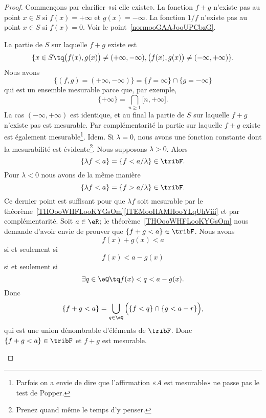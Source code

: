 \begin{proof}
	Commençons par clarifier «si elle existe». La fonction \( f+g\) n'existe pas au point \( x\in S\) si \( f(x)=+\infty\) et \( g(x)=-\infty\). La fonction \( 1/f\) n'existe pas au point \( x\in S\) si \( f(x)=0\). Voir le point~\ref{normooGAAJooUPCbzG}.
	\begin{subproof}
		La partie de \( S\) sur laquelle \( f+g\) existe est
		\begin{equation}
			\{ x\in S\tq \big( f(x),g(x) \big)\neq (+\infty,-\infty),\big( f(x),g(x) \big)\neq (-\infty,+\infty) \}.
		\end{equation}
		Nous avons
		\begin{equation}
			\{  (f,g)=(+\infty,-\infty) \}=\{ f=\infty \}\cap\{ g=-\infty \}
		\end{equation}
		qui est un ensemble mesurable parce que, par exemple,
		\begin{equation}
			\{ +\infty \}=\bigcap_{n\geq 1}\mathopen[ n , +\infty \mathclose].
		\end{equation}
		La cas \( (-\infty,+\infty)\) est identique, et au final la partie de \( S\) sur laquelle \( f+g\) n'existe pas est mesurable. Par complémentarité la partie sur laquelle \( f+g\) existe est également mesurable\footnote{Parfois on a envie de dire que l'affirmation «\( A\) est mesurable» ne passe pas le test de Popper.}.
		Idem.
		Si \( \lambda=0\), nous avons une fonction constante dont la mesurabilité est évidente\footnote{Prenez quand même le temps d'y penser.}. Nous supposons \( \lambda>0\). Alors
		\begin{equation}
			\{ \lambda f<a \}=\{ f<a/\lambda \}\in \tribF.
		\end{equation}
		Pour \( \lambda<0\) nous avons de la même manière
		\begin{equation}
			\{ \lambda f<a \}=\{ f>a/\lambda \}\in \tribF.
		\end{equation}
		Ce dernier point est suffisant pour que \( \lambda f\) soit mesurable par le théorème~\ref{THOooWHFLooKYGsOm}\ref{ITEMooHAMHooYLqUhViii} et par complémentarité.
		\spitem[Mesurabilité de \( f+g\)]
		Soit \( a\in \eR\); le théorème~\ref{THOooWHFLooKYGsOm} nous demande d'avoir envie de prouver que \(  \{ f+g <a\} \in \tribF \). Nous avons
		\begin{equation}
			f(x)+g(x)<a
		\end{equation}
		si et seulement si
		\begin{equation}
			f(x)<a-g(x)
		\end{equation}
		si et seulement si
		\begin{equation}
			\exists q\in \eQ\tq f(x)<q<a-g(x).
		\end{equation}
		Donc
		\begin{equation}
			\{ f+g<a \}=\bigcup_{q\in \eQ}\Big( \{ f<q \}\cap\{ g<a-r \} \Big),
		\end{equation}
		qui est une union dénombrable d'éléments de \( \tribF\). Donc \( \{ f+g<a \}\in \tribF\) et \( f+g\) est mesurable.


\end{subproof}
\end{proof}

